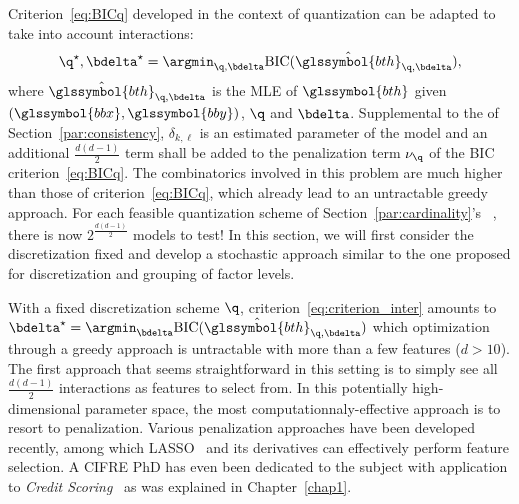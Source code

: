 Criterion~\eqref{eq:BICq} developed in the context of quantization can be adapted to take into account interactions:
\begin{equation} \label{eq:criterion_inter}
\q^\star,\bdelta^\star = \argmin_{\q,\bdelta} \text{BIC}(\hat{\glssymbol{bth}}_{\q,\bdelta}),
\end{equation}
where $\hat{\glssymbol{bth}}_{\q,\bdelta}$ is the MLE of $\glssymbol{bth}$ given $(\glssymbol{bbx},\glssymbol{bby})$, $\q$ and $\bdelta$. Supplemental to the  of Section~\ref{par:consistency}, $\delta_{k,\ell}$ is an estimated parameter of the model and an additional $\frac{d(d-1)}{2}$ term shall be added to the penalization term $\nu_\q$ of the BIC criterion~\eqref{eq:BICq}. The combinatorics involved in this problem are much higher than those of criterion~\eqref{eq:BICq}, which already lead to an untractable greedy approach. For each feasible quantization scheme of Section~\ref{par:cardinality}'s ~, there is now $2^{\frac{d(d-1)}{2}}$ models to test! In this section, we will first consider the discretization fixed and develop a stochastic approach similar to the one proposed for discretization and grouping of factor levels.

With a fixed discretization scheme $\q$, criterion~\ref{eq:criterion_inter} amounts to $\bdelta^\star = \argmin_{\bdelta} \text{BIC}(\hat{\glssymbol{bth}}_{\q,\bdelta})$ which optimization through a greedy approach is untractable with more than a few features ($d > 10$). The first approach that seems straightforward in this setting is to simply see all $\frac{d(d-1)}{2}$ interactions as features to select from. In this potentially high-dimensional parameter space, the most computationnaly-effective approach is to resort to penalization. Various penalization approaches have been developed recently, among which LASSO~\cite{tibshirani1996regression} and its derivatives can effectively perform feature selection. A CIFRE PhD has even been dedicated to the subject with application to \textit{Credit Scoring}~\cite{vital2016} as was explained in Chapter~\ref{chap1}.

